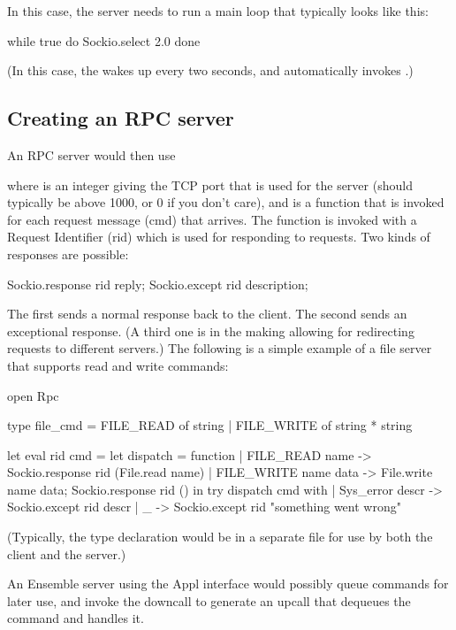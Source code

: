 In this case, the server needs to run a main loop that typically looks like this:
\begin{codebox}
  while true do
    Sockio.select 2.0
  done
\end{codebox}
(In this case, the  wakes up every two seconds, and
automatically invokes .)

\subsection{Creating an RPC server}

An RPC server would then use

where  is an integer giving the TCP port that is used for the server
(should typically be above 1000, or 0 if you don't care), and  is
a function that is invoked for each request message (cmd) that arrives.  The function
is invoked with a Request Identifier (rid) which is used for responding to requests.
Two kinds of responses are possible:
\begin{codebox}
  Sockio.response rid reply;
  Sockio.except rid description;
\end{codebox}

The first sends a normal response back to the client.  The second sends an
exceptional response.  (A third one is in the making allowing for redirecting
requests to different servers.)  The following is a simple example of a file server
that supports read and write commands:
\begin{codebox}
  open Rpc
  
  type file_cmd
    = FILE_READ of string
    | FILE_WRITE of string * string
  
  let eval rid cmd =
    let dispatch = function
      | FILE_READ name ->
          Sockio.response rid (File.read name)
      | FILE_WRITE name data ->
          File.write name data;
          Sockio.response rid ()
    in
    try
      dispatch cmd
    with
      | Sys_error descr ->
          Sockio.except rid descr
      | _ ->
          Sockio.except rid "something went wrong"
\end{codebox}
(Typically, the type declaration would be in a separate  file for use by
both the client and the server.)

An Ensemble server using the Appl interface would possibly queue commands for later
use, and invoke the  downcall to generate an upcall that dequeues the
command and handles it.

